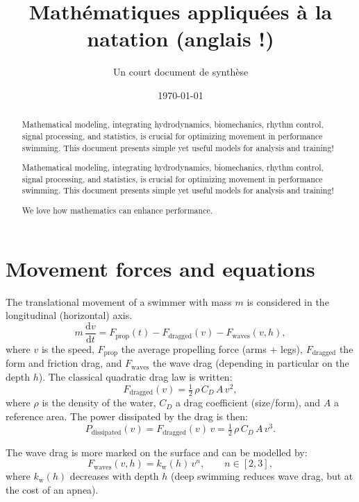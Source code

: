 \documentclass[12pt,a4paper]{article}
\title{\textbf{Mathématiques appliquées à la natation (anglais !)}}
\author{Un court document de synthèse}
\date{\today}
\newcommand{\dd}{\mathrm{d}}
\begin{document}
\maketitle

\begin{abstract}
Mathematical modeling, integrating hydrodynamics, biomechanics, rhythm control, signal processing, and statistics, is crucial for optimizing movement in performance swimming. This document presents simple yet useful models for analysis and training!

Mathematical modeling, integrating hydrodynamics, biomechanics, rhythm control, signal processing, and statistics, is crucial for optimizing movement in performance swimming. This document presents simple yet useful models for analysis and training!

We love how mathematics can enhance performance.
\end{abstract}

\section{Movement forces and equations}
The translational movement of a swimmer with mass $m$ is considered in the longitudinal (horizontal) axis.
\begin{equation}
 m\,\frac{\dd v}{\dd t} = F_{\mathrm{prop}}(t) - F_{\mathrm{dragged}}(v) - F_{\mathrm{waves}}(v,h),
 \label{eq:newton}
\end{equation}
where $v$ is the speed, $F_{\mathrm{prop}}$ the average propelling force (arms + legs), $F_{\mathrm{dragged}}$ the form and friction drag, and $F_{\mathrm{waves}}$ the wave drag (depending in particular on the depth $h$). The classical quadratic drag law is written:
\begin{equation}
 F_{\mathrm{dragged}}(v) = \tfrac{1}{2}\,\rho\,C_D\,A\,v^2,
 \end{equation}
where $\rho$ is the density of the water, $C_D$ a drag coefficient (size/form), and $A$ a reference area. The power dissipated by the drag is then:
\begin{equation}
 P_{\mathrm{dissipated}}(v) = F_{\mathrm{dragged}}(v)\,v = \tfrac{1}{2}\,\rho\,C_D\,A\,v^3.
 \end{equation}

The wave drag is more marked on the surface and can be modelled by:
\begin{equation}
 F_{\mathrm{waves}}(v,h) = k_\mathrm{w}(h)\,v^n, \qquad n\in[2,3],
 \end{equation}
where $k_\mathrm{w}(h)$ decreases with depth $h$ (deep swimming reduces wave drag, but at the cost of an apnea).
\end{document}
